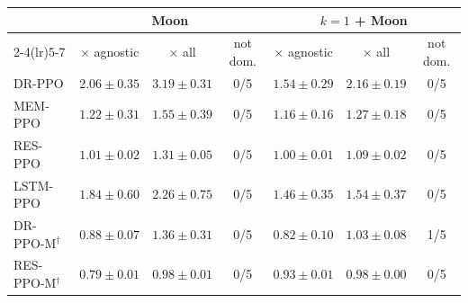 \begin{tabular}{lcccccc}
\toprule
 & \multicolumn{3}{c}{Moon} & \multicolumn{3}{c}{$k = 1$ + Moon} \\
\cmidrule(lr){2-4}\cmidrule(lr){5-7}
 & $\times$ agnostic & $\times$ all & not dom. & $\times$ agnostic & $\times$ all & not dom. \\
\midrule
DR-PPO & $2.06 \pm 0.35$ & $3.19 \pm 0.31$ & 0/5 & $1.54 \pm 0.29$ & $2.16 \pm 0.19$ & 0/5 \\
MEM-PPO & $1.22 \pm 0.31$ & $1.55 \pm 0.39$ & 0/5 & $1.16 \pm 0.16$ & $1.27 \pm 0.18$ & 0/5 \\
RES-PPO & $1.01 \pm 0.02$ & $1.31 \pm 0.05$ & 0/5 & $1.00 \pm 0.01$ & $1.09 \pm 0.02$ & 0/5 \\
LSTM-PPO & $1.84 \pm 0.60$ & $2.26 \pm 0.75$ & 0/5 & $1.46 \pm 0.35$ & $1.54 \pm 0.37$ & 0/5 \\
DR-PPO-M$^{\dagger}$ & $0.88 \pm 0.07$ & $1.36 \pm 0.31$ & 0/5 & $0.82 \pm 0.10$ & $1.03 \pm 0.08$ & 1/5 \\
RES-PPO-M$^{\dagger}$ & $0.79 \pm 0.01$ & $0.98 \pm 0.01$ & 0/5 & $0.93 \pm 0.01$ & $0.98 \pm 0.00$ & 0/5 \\
\bottomrule
\end{tabular}
